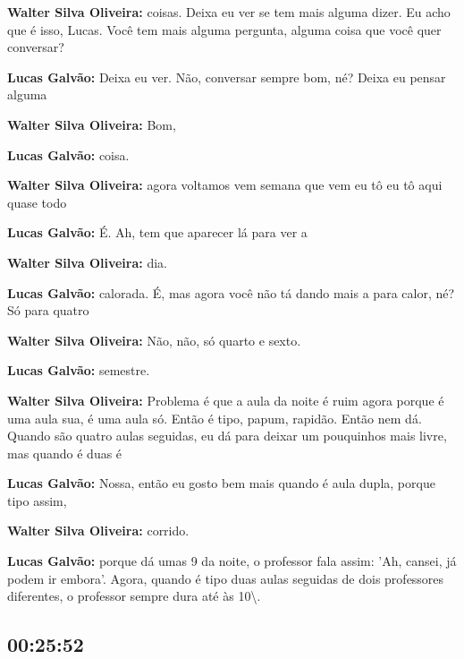 \textbf{Walter Silva Oliveira:} coisas. Deixa eu ver se tem mais alguma dizer. Eu acho que é isso, Lucas. Você tem mais alguma pergunta, alguma coisa que você quer conversar?



\textbf{Lucas Galvão:} Deixa eu ver. Não, conversar sempre bom, né? Deixa eu pensar alguma



\textbf{Walter Silva Oliveira:} Bom,



\textbf{Lucas Galvão:} coisa.



\textbf{Walter Silva Oliveira:} agora voltamos vem semana que vem eu tô eu tô aqui quase todo



\textbf{Lucas Galvão:} É. Ah, tem que aparecer lá para ver a



\textbf{Walter Silva Oliveira:} dia.



\textbf{Lucas Galvão:} calorada. É, mas agora você não tá dando mais a para calor, né? Só para quatro



\textbf{Walter Silva Oliveira:} Não, não, só quarto e sexto.



\textbf{Lucas Galvão:} semestre.



\textbf{Walter Silva Oliveira:} Problema é que a aula da noite é ruim agora porque é uma aula sua, é uma aula só. Então é tipo, papum, rapidão. Então nem dá. Quando são quatro aulas seguidas, eu dá para deixar um pouquinhos mais livre, mas quando é duas é



\textbf{Lucas Galvão:} Nossa, então eu gosto bem mais quando é aula dupla, porque tipo assim,



\textbf{Walter Silva Oliveira:} corrido.



\textbf{Lucas Galvão:} porque dá umas 9 da noite, o professor fala assim: 'Ah, cansei, já podem ir embora'. Agora, quando é tipo duas aulas seguidas de dois professores diferentes, o professor sempre dura até às 10\textbackslash{}.



\subsection{\textbf{00:25:52}}



